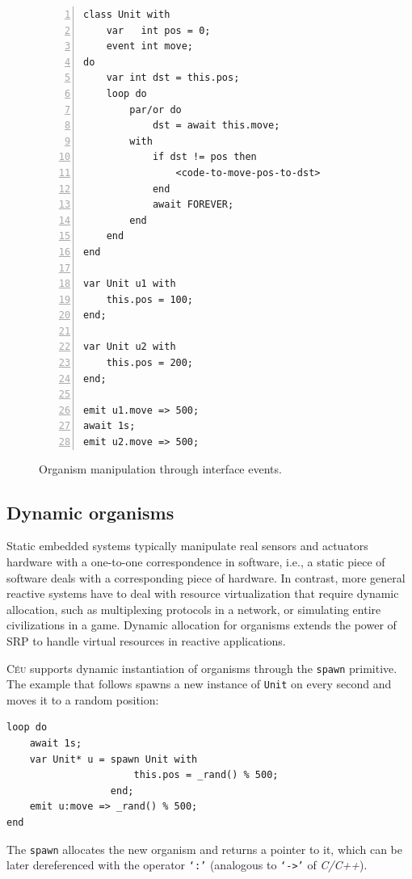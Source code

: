 \documentclass{acm_proc_article-sp}
\newcommand{\CEU}{\textsc{C\'{e}u}\xspace}
\newcommand{\code}[1] {{\small{\texttt{#1}}}}
\newcommand{\1}{\;}
\newcommand{\2}{\;\;}
\newcommand{\3}{\;\;\;}
\newcommand{\5}{\;\;\;\;\;}
\begin{document}
\begin{figure}[t]
\begin{lstlisting}[numbers=left,xleftmargin=3em]
class Unit with
    var   int pos = 0;
    event int move;
do
    var int dst = this.pos;
    loop do
        par/or do
            dst = await this.move;
        with
            if dst != pos then
                <code-to-move-pos-to-dst>
            end
            await FOREVER;
        end
    end
end

var Unit u1 with
    this.pos = 100;
end;

var Unit u2 with
    this.pos = 200;
end;

emit u1.move => 500;
await 1s;
emit u2.move => 500;
\end{lstlisting}
\caption{ Organism manipulation through interface events.
\label{lst.unit}
}
\end{figure}

\subsection{Dynamic organisms}

Static embedded systems typically manipulate real sensors and actuators 
hardware with a one-to-one correspondence in software, i.e., a static piece of 
software deals with a corresponding piece of hardware.
%
In contrast, more general reactive systems have to deal with resource 
virtualization that require dynamic allocation, such as multiplexing protocols 
in a network, or simulating entire civilizations in a game.
%
Dynamic allocation for organisms extends the power of SRP to handle virtual 
resources in reactive applications.

\CEU supports dynamic instantiation of organisms through the \code{spawn} 
primitive.
The example that follows spawns a new instance of \code{Unit} on
every second and moves it to a random position:

\begin{lstlisting}
loop do
    await 1s;
    var Unit* u = spawn Unit with
                      this.pos = _rand() % 500;
                  end;
    emit u:move => _rand() % 500;
end
\end{lstlisting}

The \code{spawn} allocates the new organism and returns a pointer to it, which 
can be later dereferenced with the operator \code{`:'} (analogous to 
\code{`->'} of \emph{C/C++}).

\end{document}
